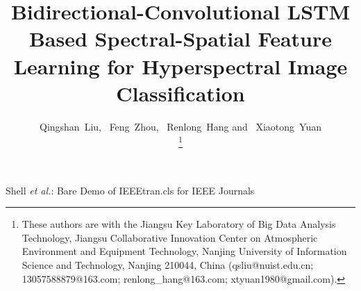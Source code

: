 \documentclass[12pt,onecolumn]{IEEEtran}
\begin{document}
\title{Bidirectional-Convolutional LSTM Based Spectral-Spatial Feature Learning for Hyperspectral Image Classification}

\author{Qingshan~Liu,
        ~Feng~Zhou,
        ~Renlong~Hang
        and ~Xiaotong~Yuan

\thanks{These authors are with the Jiangsu Key Laboratory of Big Data Analysis Technology, Jiangsu Collaborative Innovation Center on Atmospheric Environment and Equipment Technology,
Nanjing University of Information Science and Technology, Nanjing 210044, China (qsliu$@$nuist.edu.cn; 13057588879@163.com; renlong\_hang@163.com; xtyuan1980@gmail.com).
}
}

\markboth{}%
{Shell \MakeLowercase{\textit{et al.}}: Bare Demo of IEEEtran.cls for IEEE Journals}

\maketitle
\end{document}
